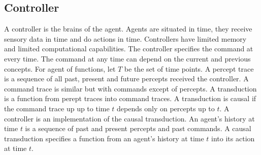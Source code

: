 \documentclass[a4paper]{article}
\theoremstyle{plain}
\theoremstyle{definition}
\theoremstyle{remark}
\begin{document}
\subsection{Controller}
A controller is the brains of the agent. Agents are situated in time, they receive sensory data in time and do actions in time. Controllers have limited memory and limited computational capabilities. The controller specifies the command at every time. The command at any time can depend on the current and previous concepts. For agent of functions, let $T$ be the set of time points. A percept trace is a sequence of all past, present and future percepts received the controller. A command trace is similar but with commands except of percepts. A transduction is a function from perept traces into command traces. A transduction is causal if the command trace up up to time $t$ depends only on percepts up to $t$. A controller is an implementation of the causal transduction. An agent's history at time $t$ is a sequence of past and present percepts and past commands. A causal transduction specifies a function from an agent's history at time $t$ into its action at time $t$.
\end{document}
